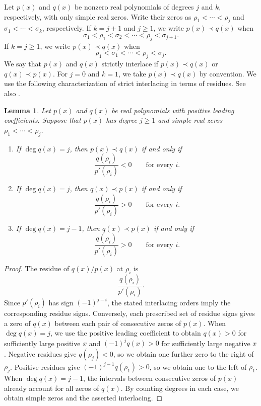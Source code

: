 \documentclass[11pt]{article}
\numberwithin{equation}{section}
\newtheorem{lemma}[theorem]{Lemma}
\theoremstyle{remark}\newtheorem{remark}[theorem]{Remark}
\begin{document}
Let $p(x)$ and $q(x)$ be nonzero real polynomials of degrees $j$ and $k$,
respectively, with only simple real zeros. Write their zeros as
$\rho_1<\cdots<\rho_j$ and $\sigma_1<\cdots<\sigma_k$, respectively.
If $k=j+1$ and $j\ge1$, we write $p(x)\prec q(x)$ when
\[
 \sigma_1<\rho_1<\sigma_2<\cdots<\rho_j<\sigma_{j+1}.
\]
If $k=j\ge1$, we write $p(x)\prec q(x)$ when
\[
 \rho_1<\sigma_1<\cdots<\rho_j<\sigma_j.
\]
We say that $p(x)$ and $q(x)$ strictly interlace if
$p(x)\prec q(x)$ or $q(x)\prec p(x)$.
For $j=0$ and $k=1$, we take $p(x)\prec q(x)$ by convention.
We use the following characterization of strict interlacing in terms
of residues. See also \cite{HT}.

\begin{lemma}\label{c:lem:residue}
Let $p(x)$ and $q(x)$ be real polynomials with positive leading
coefficients. Suppose that $p(x)$ has degree $j\ge1$ and simple real
zeros $\rho_1<\cdots<\rho_j$.
\begin{enumerate}
\item[(i)] If $\deg q(x)=j$, then $p(x)\prec q(x)$ if and only if
\[
 \frac{q(\rho_i)}{p'(\rho_i)}<0\qquad\text{for every }i.
\]
\item[(ii)] If $\deg q(x)=j$, then $q(x)\prec p(x)$ if and only if
\[
 \frac{q(\rho_i)}{p'(\rho_i)}>0\qquad\text{for every }i.
\]
\item[(iii)] If $\deg q(x)=j-1$, then $q(x)\prec p(x)$ if and only if
\[
 \frac{q(\rho_i)}{p'(\rho_i)}>0\qquad\text{for every }i.
\]
\end{enumerate}
\end{lemma}
\begin{proof}
The residue of $q(x)/p(x)$ at $\rho_i$ is
\[
 \frac{q(\rho_i)}{p'(\rho_i)}.
\]
Since $p'(\rho_i)$ has sign $(-1)^{j-i}$, the stated interlacing
orders imply the corresponding residue signs.
Conversely, each prescribed set of residue signs gives a zero of
$q(x)$ between each pair of consecutive zeros of $p(x)$.
When $\deg q(x)=j$, we use the positive leading coefficient to obtain
$q(x)>0$ for sufficiently large positive $x$ and
$(-1)^j q(x)>0$ for sufficiently large negative $x$.
Negative residues give $q(\rho_j)<0$, so we obtain one further
zero to the right of $\rho_j$. Positive residues give
$(-1)^{j-1}q(\rho_1)>0$, so we obtain one to the left of $\rho_1$.
When $\deg q(x)=j-1$, the intervals between consecutive zeros of
$p(x)$ already account for all zeros of $q(x)$. By counting degrees in each
case, we obtain simple zeros and the asserted interlacing.
\end{proof}
\end{document}
